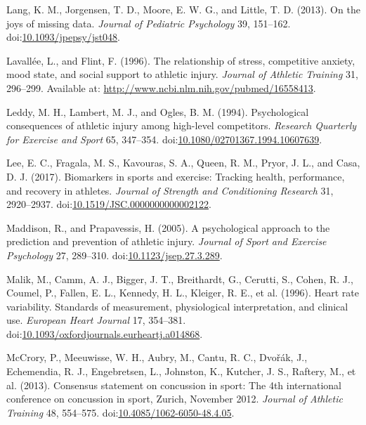 \documentclass[
  english,
  man,floatsintext]{apa6}
\newlength{\cslhangindent}
\newenvironment{cslreferences}%
  {\setlength{\parindent}{0pt}%
  \everypar{\setlength{\hangindent}{\cslhangindent}}\ignorespaces}%
  {\par}
\begin{document}
\begin{cslreferences}
\leavevmode\hypertarget{ref-Lang2014}{}%
Lang, K. M., Jorgensen, T. D., Moore, E. W. G., and Little, T. D. (2013). On the joys of missing data. \emph{Journal of Pediatric Psychology} 39, 151--162. doi:\href{https://doi.org/10.1093/jpepsy/jst048}{10.1093/jpepsy/jst048}.

\leavevmode\hypertarget{ref-Lavallee1996}{}%
Lavallée, L., and Flint, F. (1996). The relationship of stress, competitive anxiety, mood state, and social support to athletic injury. \emph{Journal of Athletic Training} 31, 296--299. Available at: \url{http://www.ncbi.nlm.nih.gov/pubmed/16558413}.

\leavevmode\hypertarget{ref-Leddy1994}{}%
Leddy, M. H., Lambert, M. J., and Ogles, B. M. (1994). Psychological consequences of athletic injury among high-level competitors. \emph{Research Quarterly for Exercise and Sport} 65, 347--354. doi:\href{https://doi.org/10.1080/02701367.1994.10607639}{10.1080/02701367.1994.10607639}.

\leavevmode\hypertarget{ref-Lee2017}{}%
Lee, E. C., Fragala, M. S., Kavouras, S. A., Queen, R. M., Pryor, J. L., and Casa, D. J. (2017). Biomarkers in sports and exercise: Tracking health, performance, and recovery in athletes. \emph{Journal of Strength and Conditioning Research} 31, 2920--2937. doi:\href{https://doi.org/10.1519/JSC.0000000000002122}{10.1519/JSC.0000000000002122}.

\leavevmode\hypertarget{ref-Maddison2005}{}%
Maddison, R., and Prapavessis, H. (2005). A psychological approach to the prediction and prevention of athletic injury. \emph{Journal of Sport and Exercise Psychology} 27, 289--310. doi:\href{https://doi.org/10.1123/jsep.27.3.289}{10.1123/jsep.27.3.289}.

\leavevmode\hypertarget{ref-Malik1996}{}%
Malik, M., Camm, A. J., Bigger, J. T., Breithardt, G., Cerutti, S., Cohen, R. J., Coumel, P., Fallen, E. L., Kennedy, H. L., Kleiger, R. E., et al. (1996). Heart rate variability. Standards of measurement, physiological interpretation, and clinical use. \emph{European Heart Journal} 17, 354--381. doi:\href{https://doi.org/10.1093/oxfordjournals.eurheartj.a014868}{10.1093/oxfordjournals.eurheartj.a014868}.

\leavevmode\hypertarget{ref-McCrory2013}{}%
McCrory, P., Meeuwisse, W. H., Aubry, M., Cantu, R. C., Dvořák, J., Echemendia, R. J., Engebretsen, L., Johnston, K., Kutcher, J. S., Raftery, M., et al. (2013). Consensus statement on concussion in sport: The 4th international conference on concussion in sport, Zurich, November 2012. \emph{Journal of Athletic Training} 48, 554--575. doi:\href{https://doi.org/10.4085/1062-6050-48.4.05}{10.4085/1062-6050-48.4.05}.


\end{cslreferences}
\end{document}
